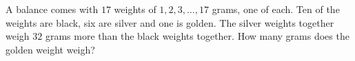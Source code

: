 A balance comes with $17$ weights of $1, 2, 3, \dots, 17$ grams, one of each. Ten of the weights are black, six are silver and one is golden. The silver weights together weigh $32$ grams more than the black weights together. How many grams does the golden weight weigh?
